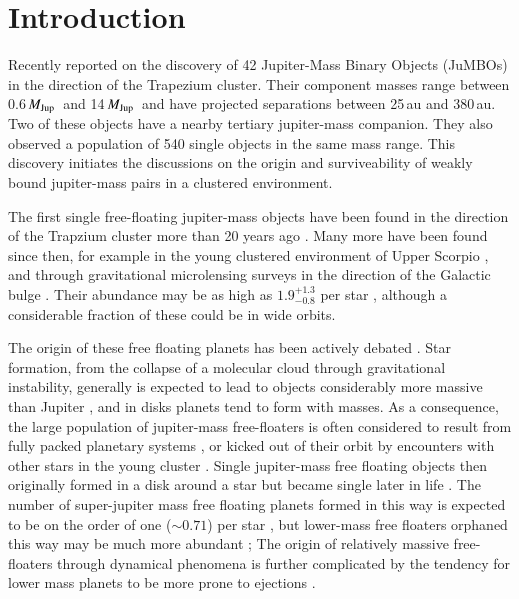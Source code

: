 \documentclass[submission,phys]{lib/SciPost}
\newcommand{\MJup}{\mbox{${M}_{\rm Jup}$}}
\newcommand{\jumbos}{\mbox{JuMBOs}}
\begin{document}
\section{Introduction}

Recently \cite{2023arXiv231001231P} reported on the discovery of 42
Jupiter-Mass Binary Objects (\jumbos) in the direction of the
Trapezium cluster.  Their component masses range between 0.6\,\MJup\,
and 14\,\MJup\, and have projected separations between 25\,au and
380\,au.  Two of these objects have a nearby tertiary jupiter-mass
companion.  They also observed a population of 540 single objects in
the same mass range. This discovery initiates the discussions on the
origin and surviveability of weakly bound jupiter-mass pairs in a
clustered environment.

The first single free-floating jupiter-mass objects have been found in
the direction of the Trapzium cluster more than 20 years ago
\cite{2000Sci...290..103Z,2000MNRAS.314..858L,2000AGM....17..A11M}.
Many more have been found since then, for example in the young
clustered environment of Upper Scorpio \cite{2022NatAs...6...89M}, and
through gravitational microlensing surveys in the direction of the
Galactic bulge \cite{2011Natur.473..349S}.  Their abundance may be as
high as $1.9^{+1.3}_{-0.8}$ per star \cite{2011Natur.473..349S},
although a considerable fraction of these could be in wide orbits.

The origin of these free floating planets has been actively debated
\cite{2023Ap&SS.368...17M}. Star formation, from the collapse of a
molecular cloud through gravitational instability, generally is
expected to lead to objects considerably more massive than Jupiter
\cite{1976MNRAS.176..367L,2005A&A...430.1059B}, and in disks planets
tend to form with masses. As a consequence, the large population of
jupiter-mass free-floaters is often considered to result from fully
packed planetary systems \cite{2023arXiv231015603C}, or kicked out of
their orbit by encounters with other stars in the young cluster
\cite{2019A&A...624A.120V}. Single jupiter-mass free floating objects
then originally formed in a disk around a star but became single later
in life
\cite{1996Sci...274..954R,2015MNRAS.453.2759Z,2002ApJ...565.1251H,2017MNRAS.470.4337C,
  2019MNRAS.489.2280F,2019A&A...624A.120V}.  The number of
super-jupiter mass free floating planets formed in this way is
expected to be on the order of one ($\sim 0.71$) per star
\cite{2019A&A...624A.120V}, but lower-mass free floaters orphaned this
way may be much more abundant \cite{2002ApJ...565.1251H}; The origin
of relatively massive free-floaters through dynamical phenomena is
further complicated by the tendency for lower mass planets to be more
prone to ejections
\cite{2001Icar..150..303F,2013MNRAS.433..867H,2019MNRAS.489.2280F,2020MNRAS.497.1807S}.
\end{document}
